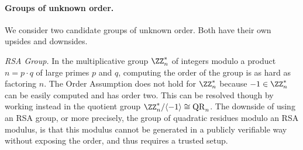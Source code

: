 \ifappendix
\else 

\fi

\paragraph{Groups of unknown order.}
We consider two candidate groups of unknown order. Both have their own upsides and downsides.

\textit{RSA Group.} In the multiplicative group $\ZZ_n^*$ of integers modulo a product $n=p\cdot q$ of large primes $p$ and $q$, computing the order of the group is as hard as factoring $n$. The Order Assumption does not hold for $\ZZ_n^*$ because $-1 \in \ZZ_n^*$ can be easily computed and has order two. This can be resolved though by working instead in the quotient group $\ZZ_n^* / \langle-1\rangle \cong \mathrm{QR}_n$. %
The downside of using an RSA group, or more precisely, the group of quadratic residues modulo an RSA modulus, is that this modulus cannot be generated in a publicly verifiable way without exposing the order, and thus requires a trusted setup.


